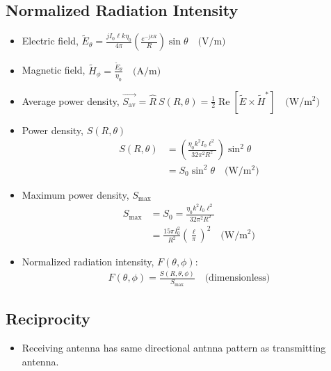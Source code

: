 \documentclass[a4paper]{article}
\begin{document}
\subsection{Normalized Radiation Intensity}
\begin{itemize}
    \item Electric field, $\widetilde{E}_\theta = \displaystyle\frac{jI_0\ell k\eta_0}{4\pi}\left(\displaystyle\frac{e^{-jkR}}{R}\right)\sin\theta\quad\text{(V/m)}$
    \item Magnetic field, $\widetilde{H}_\phi = \displaystyle\frac{\widetilde{E}_\theta}{\eta_0}\quad\text{(A/m)}$ 
    \item Average power density, $\overrightarrow{S_\text{av}} = \hat{R}\ S(R, \theta) = \displaystyle\frac{1}{2}\operatorname{Re}\left[\widetilde{E}\times\widetilde{H}^*\right]\quad\text{(W/}\text{m}^2)$
    \item Power density, $S(R, \theta)$
    \begin{align*}
        S(R, \theta) &= \left(\displaystyle\frac{\eta_0k^2I_0\ell^2}{32\pi^2R^2}\right)\sin^2\theta\\
        &= S_0\sin^2\theta\quad\text{(W/}\text{m}^2)
    \end{align*}
    \item Maximum power density, $S_\text{max}$
    \begin{align*}
        S_\text{max} &= S_0 = \frac{\eta_0k^2I_0\ell^2}{32\pi^2R^2}\\
        &= \frac{15\pi I_0^2}{R^2}\left(\frac{\ell}{\pi}\right)^2\quad\text{(W/}\text{m}^2)
    \end{align*}
    \item Normalized radiation intensity, $F(\theta, \phi)$:
    \begin{align*}
        F(\theta, \phi) = \frac{S(R, \theta, \phi)}{S_\text{max}}\quad\text{(dimensionless)}
    \end{align*}
\end{itemize}

\subsection{Reciprocity}
\begin{itemize}
    \item Receiving antenna has same directional antnna pattern as transmitting antenna.
\end{itemize}
\end{document}

